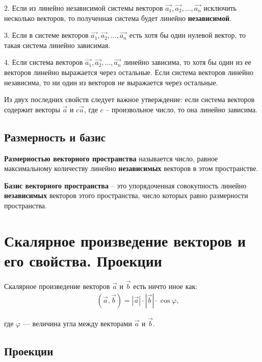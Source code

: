 \documentclass[12pt, fleqn]{extarticle}
\begin{document}
2. Если из линейно независимой системы векторов \(\overrightarrow{a_1}, \overrightarrow{a_2}, ..., \overrightarrow{a_n}\) исключить несколько векторов, то полученная система будет линейно \textbf{независимой}.

3. Если в системе векторов \(\overrightarrow{a_1}, \overrightarrow{a_2}, ..., \overrightarrow{a_n}\) есть хотя бы один нулевой вектор, то такая система линейно зависимая.

4. Если система векторов \(\overrightarrow{a_1}, \overrightarrow{a_2}, ..., \overrightarrow{a_n}\) линейно зависима, то хотя бы один из ее векторов линейно выражается через остальные. Если система векторов линейно независима, то ни один из векторов не выражается через остальные.

Из двух последних свойств следует важное утверждение:
если система векторов содержит векторы \(\overrightarrow{a}\) и \(c \overrightarrow{a}\), где \(c\) – произвольное число, то она линейно зависима.

\subsection*{Размерность и базис}
\textbf{Размерностью векторного пространства} называется число, равное максимальному количеству линейно \textbf{независимых} векторов в этом пространстве.

\textbf{Базис векторного пространства} – это упорядоченная совокупность линейно \textbf{независимых} векторов этого пространства, число которых равно размерности пространства.

\newpage

\section{Скалярное произведение векторов и его свойства. Проекции}\label{sec:scalar-multiply}

Скалярное произведение векторов \(\overrightarrow{a}\) и \(\overrightarrow{b}\) есть ничто иное как:
\begin{align*}
     &  &
    (\overrightarrow{a}, \overrightarrow{b}) = |\overrightarrow{a}| \cdot |\overrightarrow{b}| \cdot \cos{\varphi},
\end{align*}

где \(\varphi\) — величина угла между векторами \(\overrightarrow{a}\) и \(\overrightarrow{b}\).

\subsection*{Проекции}
\end{document}
